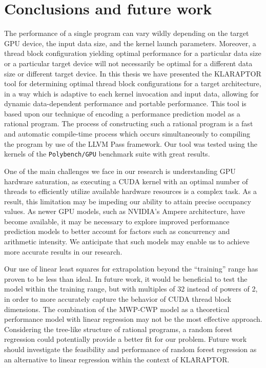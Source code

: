 \chapter{Conclusions and future work}
\label{ch:conclusion}

The performance of a single {\cuda} program can vary wildly
depending on the target GPU device, the input data size, 
and the kernel launch parameters. Moreover, a thread block
configuration yielding optimal performance for a particular data size or a particular
target device will not necessarily be optimal for
a different data size or different target device. 
In this thesis we have presented the KLARAPTOR tool for 
determining optimal {\cuda} thread block configurations
for a target architecture, in a way which is adaptive
to each kernel invocation and input data, 
allowing for dynamic data-dependent performance and portable performance.
This tool is based upon our technique of encoding a 
performance prediction model as a rational program.
The process of constructing such a rational program is a fast 
and automatic compile-time
process which occurs simultaneously to compiling
the {\cuda} program by use of the LLVM Pass framework. 
Our tool was tested using the kernels of the \texttt{Polybench/GPU} benchmark suite
with great results.

One of the main challenges we face in our research is understanding GPU hardware saturation, 
as executing a CUDA kernel with an optimal number of threads to efficiently utilize available hardware 
resources is a complex task. As a result, this limitation may be impeding our ability to attain precise occupancy values.
As newer GPU models, such as NVIDIA's Ampere architecture, have become available, it may be necessary to explore improved performance 
prediction models to better account for factors such as concurrency and arithmetic intensity. 
We anticipate that such models may enable us to achieve more accurate results in our research.

Our use of linear least squares for extrapolation beyond the ``training'' range has proven to be less than ideal. 
In future work, it would be beneficial to test the model within the training range, but with multiples of 32 instead of 
powers of 2, in order to more accurately capture the behavior of CUDA thread block dimensions. The combination of the MWP-CWP model 
as a theoretical performance model with linear regression may not 
be the most effective approach. Considering the tree-like structure of rational programs, a random forest regression 
could potentially provide a better fit for our problem. Future work should investigate the feasibility and performance 
of random forest regression as an alternative to linear regression within the context of KLARAPTOR.

